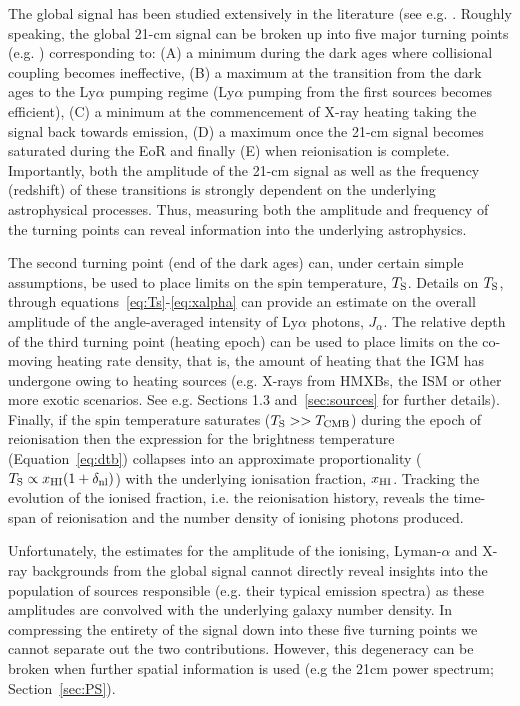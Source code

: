 The global signal has been studied extensively in the literature (see e.g. \cite{Furlanetto:2006c,Pritchard:2010a,Pritchard:2012,Mirocha:2013,Fialkov:2014,Mirocha:2014,Mirocha:2015,Mirocha:2017,Cohen:2017,Fialkov:2018,Mirocha:2018,Fialkov:2019b}. Roughly speaking, the global 21-cm signal can be broken up into five major turning points (e.g. \cite{Furlanetto:2006b,Pritchard:2010a}) corresponding to: (A) a minimum during the dark ages where collisional coupling becomes ineffective, (B) a maximum at the transition from the dark ages to the Ly$\alpha$ pumping regime (Ly$\alpha$ pumping from the first sources becomes efficient), (C) a minimum at the commencement of X-ray heating taking the signal back towards emission, (D) a maximum once the 21-cm signal becomes saturated during the EoR and finally (E) when reionisation is complete. Importantly, both the amplitude of the 21-cm signal as well as the frequency (redshift) of these transitions is strongly dependent on the underlying astrophysical processes. Thus, measuring both the amplitude and frequency of the turning points can reveal information into the underlying astrophysics.

The second turning point (end of the dark ages) can, under certain simple assumptions, be used to place limits on the spin temperature, $T_{\rm S}$. Details on $T_{\rm S}$, through equations~\ref{eq:Ts}-\ref{eq:xalpha} can provide an estimate on the overall amplitude of the angle-averaged intensity of Ly$\alpha$ photons, $J_{\alpha}$. 
The relative depth of the third turning point (heating epoch) can be used to place limits on the co-moving heating rate density, that is, the amount of heating that the IGM has undergone owing to heating sources (e.g. X-rays from HMXBs, the ISM or other more exotic scenarios. See e.g. Sections 1.3 and~\ref{sec:sources} for further details). Finally, if the spin temperature saturates ($T_{\rm S} >> T_{\rm CMB}$) during the epoch of reionisation then the expression for the brightness temperature (Equation~\ref{eq:dtb}) collapses into an approximate proportionality ($T_{\rm S} \propto x_{\rm H{\scriptstyle I}}(1+\delta_{\rm nl})$) with the underlying ionisation fraction, $x_{\rm H{\scriptstyle I}}$. Tracking the evolution of the ionised fraction, i.e. the reionisation history, reveals the time-span of reionisation and the number density of ionising photons produced. 

Unfortunately, the estimates for the amplitude of the ionising, Lyman-$\alpha$ and X-ray backgrounds from the global signal cannot directly reveal insights into the population of sources responsible (e.g. their typical emission spectra) as these amplitudes are convolved with the underlying galaxy number density. In compressing the entirety of the signal down into these five turning points we cannot separate out the two contributions. However, this degeneracy can be broken when further spatial information is used (e.g the 21cm power spectrum; Section~\ref{sec:PS}).

